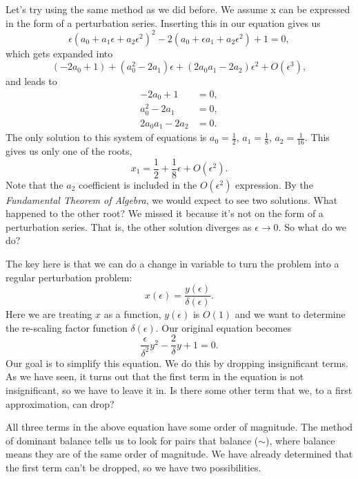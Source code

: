 \documentclass[12pt]{article}
\begin{document}
Let's try using the same method as we did before. We assume x can be
expressed in the form of a perturbation series. Inserting this in our
equation gives us
\begin{equation}
\epsilon (a_0 + a_1 \epsilon + a_2 \epsilon^2)^2 - 2(a_0 + \epsilon a_1 +
a_2 \epsilon^2) + 1 = 0,
\end{equation}
which gets expanded into
\begin{equation}
(- 2 a_0 + 1) + (a_0^2 - 2 a_1) \epsilon + (2 a_0 a_1 -2 a_2) \epsilon^2 +
O(\epsilon^3),
\end{equation}
and leads to
\begin{align}
- 2 a_0 + 1 &= 0, \\
a_0^2 - 2 a_1 &= 0, \\
2 a_0 a_1 -2 a_2 &= 0.
\end{align}
The only solution to this system of equations is $a_0 = \frac{1}{2}$,
$a_1=\frac{1}{8}$, $a_2 = \frac{1}{16}$. This gives us only one of the
roots,
\begin{equation}
x_1 = \frac{1}{2} + \frac{1}{8} \epsilon + O(\epsilon^2).
\end{equation}
Note that the $a_2$ coefficient is included in the $O(\epsilon^2)$
expression. By the \textit{Fundamental Theorem of Algebra}, we would
expect to see two solutions. What happened to the other root? We
missed it because it's not on the form of a perturbation series. That
is, the other solution diverges as $\epsilon \to 0$. So what do we do?

The key here is that we can do a change in variable to turn the
problem into a regular perturbation problem:
\begin{equation}
x(\epsilon) = \frac{y(\epsilon)}{\delta(\epsilon)}.
\end{equation}
Here we are treating $x$ as a function, $y(\epsilon)$ is $O(1)$ and we want to
determine the re-scaling factor function $\delta(\epsilon)$. Our original
equation becomes
\begin{equation}
\frac{\epsilon}{\delta^2} y^2 - \frac{2}{\delta} y + 1 = 0.
\end{equation}
Our goal is to simplify this equation. We do this by dropping
insignificant terms. As we have seen, it turns out that the first term
in the equation is not insignificant, so we have to leave it in. Is
there some other term that we, to a first approximation, can drop?

All three terms in the above equation have some order of
magnitude. The method of dominant balance tells us to look for pairs
that balance ($\sim$), where balance means they are of the same order
of magnitude. We have already determined that the first term can't be
dropped, so we have two possibilities.
\end{document}
